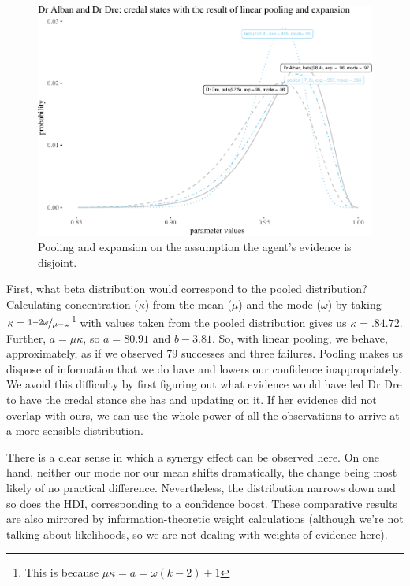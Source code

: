 \documentclass[
  10pt,
  dvipsnames,enabledeprecatedfontcommands]{scrartcl}
\begin{document}
\begin{figure}[H]

\begin{center}\includegraphics[width=1\linewidth]{impreciseEpistemicFINAL_files/figure-latex/fig:Dre-1} \end{center}
\caption{Pooling and expansion on the assumption the agent's evidence is disjoint.}
\label{fig:dre}
\end{figure}

First, what beta distribution would correspond to the pooled
distribution? Calculating concentration (\(\kappa\)) from the mean
(\(\mu\)) and the mode (\(\omega\)) by taking
\(\kappa = \nicefrac{1-2\omega}{\mu-\omega}\)\footnote{This is because $\mu \kappa = a = \omega(k - 2) +1$}
with values taken from the pooled distribution gives us
\(\kappa= .84.72\). Further, \(a = \mu \kappa\), so \(a = 80.91\) and
\(b - 3.81\). So, with linear pooling, we behave, approximately, as if
we observed 79 successes and three failures. Pooling makes us dispose of
information that we do have and lowers our confidence inappropriately.
We avoid this difficulty by first figuring out what evidence would have
led Dr Dre to have the credal stance she has and updating on it. If her
evidence did not overlap with ours, we can use the whole power of all
the observations to arrive at a more sensible distribution.

There is a clear sense in which a synergy effect can be observed here.
On one hand, neither our mode nor our mean shifts dramatically, the
change being most likely of no practical difference. Nevertheless, the
distribution narrows down and so does the HDI, corresponding to a
confidence boost. These comparative results are also mirrored by
information-theoretic weight calculations (although we're not talking
about likelihoods, so we are not dealing with weights of evidence here).
\end{document}
